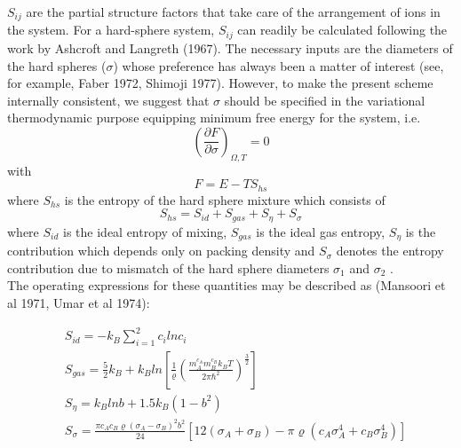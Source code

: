\documentclass[12pt]{article}
\newcommand*{\1}{\hspace{1pt}}
\begin{document}
        $S_{ij}$ are the partial structure factors that take care of the arrangement of ions in the
    system. For a hard-sphere system,  $S_{ij}$ can readily be calculated following the work by
    Ashcroft and Langreth (1967). The necessary inputs are the diameters of the hard spheres ($\sigma $)
    whose preference has always been a matter of interest (see, for example, Faber 1972, Shimoji
    1977). However, to make the present scheme internally consistent, we suggest that $\sigma$ should be 
    specified in the variational thermodynamic purpose equipping minimum free
    energy for the system, i.e.
        \begin{equation}
        \left(\frac{\partial F}{\partial \sigma }\right) _{\Omega ,T} = 0
        \end{equation}
    with\\
        \begin{equation}
            F = E - TS_{hs}
        \end{equation}
    where $S_{hs}$ is the entropy of the hard sphere mixture which consists of \\
        \begin{equation}
            S_{hs} = S_{id} + S_{gas} + S_{\eta} + S_{\sigma}
        \end{equation}
    where $S_{id}$ is the ideal entropy of mixing, $S_{gas}$ is the ideal gas entropy, $S_{\eta}$ 
    is the contribution
    which depends only on packing density and $S_{\sigma}$ denotes the entropy contribution due to
    mismatch of the hard sphere diameters $\sigma_1$ and $\sigma_2$ .\\
        The operating expressions for these quantities may be described as (Mansoori et al 1971,
    Umar et al 1974): 
    

    \begin{align}
        &  S_{id} = -k_B \sum_{i = 1}^{2} c_{i} lnc_{i} \\
        &  S_{gas} = \frac{5}{2}k_{B} + k_{B}ln\left[\frac{1}{\varrho}\left(\frac{m^{c_{A}}_{A}m^{c_{B}}_{B}k_{B}T}{{2\pi \hbar ^{2}}}\right)^{\frac{3}{2}} \right] \\
        &  S_{\eta} = k_B lnb + 1.5k_{B}(1 - b^2)\\
        & S_{\sigma} = \frac{\pi c_{A}c_{B}\varrho(\sigma_{A} - \sigma_{B})^{2}b^{2}}{24}[12(\sigma_{A} + \sigma_{B}) -
        \pi \varrho (c_{A}\sigma^{4}_{A} + c_{B}\sigma^{4}_{B})]     
        \end{align}\\
\end{document}
